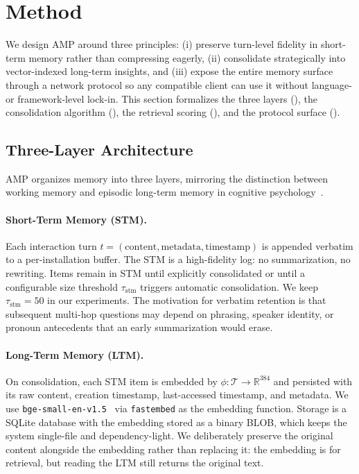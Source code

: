 \section{Method}
\label{sec:method}

We design AMP around three principles: (i) preserve turn-level fidelity in short-term memory rather than compressing eagerly, (ii) consolidate strategically into vector-indexed long-term insights, and (iii) expose the entire memory surface through a network protocol so any compatible client can use it without language- or framework-level lock-in. This section formalizes the three layers (), the consolidation algorithm (), the retrieval scoring (), and the protocol surface ().

\subsection{Three-Layer Architecture}
\label{sec:method-arch}

AMP organizes memory into three layers, mirroring the distinction between working memory and episodic long-term memory in cognitive psychology~\citep{baddeley2003working}.

\paragraph{Short-Term Memory (STM).} Each interaction turn $t = (\text{content}, \text{metadata}, \text{timestamp})$ is appended verbatim to a per-installation buffer. The STM is a high-fidelity log: no summarization, no rewriting. Items remain in STM until explicitly consolidated or until a configurable size threshold $\tau_{\text{stm}}$ triggers automatic consolidation. We keep $\tau_{\text{stm}} = 50$ in our experiments. The motivation for verbatim retention is that subsequent multi-hop questions may depend on phrasing, speaker identity, or pronoun antecedents that an early summarization would erase.

\paragraph{Long-Term Memory (LTM).} On consolidation, each STM item is embedded by $\phi: \mathcal{T} \to \mathbb{R}^{384}$ and persisted with its raw content, creation timestamp, last-accessed timestamp, and metadata. We use \texttt{bge-small-en-v1.5}~\citep{xiao2023cpack} via \texttt{fastembed} as the embedding function. Storage is a SQLite database with the embedding stored as a binary BLOB, which keeps the system single-file and dependency-light. We deliberately preserve the original content alongside the embedding rather than replacing it: the embedding is for retrieval, but reading the LTM still returns the original text.

